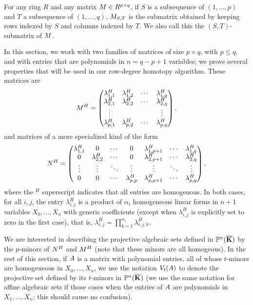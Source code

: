 \documentclass[12pt]{article}
\begin{document}
For any ring $R$ and any matrix ${M} \in R^{p\times q}$, if $S$ is a
subsequence of $(1,\dots,p)$ and $T$ a subsequence of $(1,\dots,q)$,
${M}_{S,T}$ is the submatrix obtained by keeping rows indexed by $S$
and columns indexed by $T$. We also call this the $(S,T)$-submatrix of ${M}$.

In this section, we work with two families of matrices of size $p
\times q$, with $p \le q$, and with entries that are polynomials in
$n=q-p+1$ variables; we prove several properties that will be used 
in our row-degree homotopy algorithm.
These matrices are
\begin{align}\label{eqdef:type2}
{M}^H= \left( \begin{matrix}
\lambda^H_{1,1} & \lambda^H_{1,2} & \cdots & \lambda^H_{1, q}\\
 \lambda^H_{2,1} &  \lambda^H_{2,2} & \cdots & \lambda^H_{2, q}\\
 \vdots & & & \vdots\\
 \lambda^H_{p,1} &  \lambda^H_{p,2}& \cdots & \lambda^H_{p, q}
\end{matrix} \right),
\end{align}
and matrices of a more specialized kind of the form
\begin{align}\label{eqdef:type1}
{N}^H= \left( \begin{matrix}
\lambda^H_{1,1} & 0 & \cdots & 0 & \lambda^H_{1,p+1} & \cdots & \lambda^H_{1, q}\\
0 & \lambda^H_{2,2} & \cdots & 0 & \lambda^H_{2,p+1} & \cdots & \lambda^H_{2, q}\\
\vdots & \vdots & \ddots & \vdots & \vdots & \ddots & \vdots\\
0 & 0 & \cdots & \lambda^H_{p,p} & \lambda^H_{p,p+1} & \cdots & \lambda^H_{p, q}
\end{matrix} \right),
\end{align}
where the ${}^H$ superscript indicates that all entries are
homogenous.  In both cases, for all $i,j$, the entry $\lambda^H_{i,j}$
is a product of $\alpha_i$ homogeneous linear forms in $n+1$ variables
$X_0,\dots,X_n$ with generic coefficients (except when
$\lambda^H_{i,j}$ is explicitly set to zero in the first case), that
is, $\lambda^H_{i,j}=\prod_{k=1}^{\alpha_i} \lambda^H_{i,j,k}$.  

We are interested in describing the projective algebraic sets defined
in $\mathbb{P}^n(\overline{\mathbf{K}})$ by the $p$-minors of ${N}^H$ and ${M}^H$ (note that
these minors are all homogeous). In the rest of this section, if ${A}$
is a matrix with polynomial entries, all of whose $t$-minors are
homogeneous in $X_0,\dots,X_n$, we use the notation $V_t({A})$ to
denote the projective set defined by its $t$-minors in $\mathbb{P}^n(\overline{\mathbf{K}})$
(we use the same notation for affine algebraic sets if those cases 
when the entries of ${A}$ are polynomials in $X_1,\dots,X_n$; 
this should cause no confusion).
\end{document}
